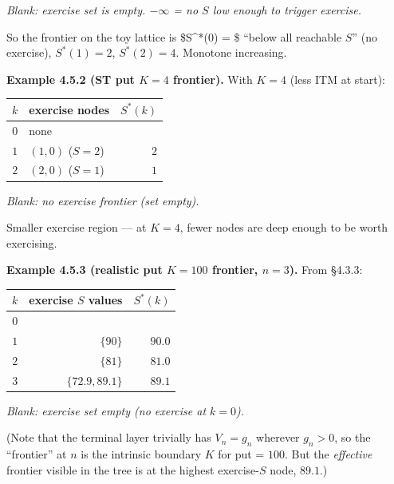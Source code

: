 \documentclass[
  10pt,
  twoside]{book}
\newcounter{none} %
\begin{document}
\emph{Blank: exercise set is empty. \(-\infty\) = no \(S\) low enough to
trigger exercise.}

So the frontier on the toy lattice is \$S\^{}*(0) = \$ ``below all
reachable \(S\)'' (no exercise), \(S^*(1) = 2\), \(S^*(2) = 4\).
Monotone increasing.

\textbf{Example 4.5.2 (ST put \(K=4\) frontier).} With \(K = 4\) (less
ITM at start):

{\def\LTcaptype{none} %
\begin{table}[H]
\centering
\begin{tabular}{|c|l|r|}
\toprule
\(k\) & exercise nodes & \(S^*(k)\) \\
\midrule



\(0\) & none & \\
\(1\) & \((1,0)\) (\(S=2\)) & \(2\) \\
\(2\) & \((2,0)\) (\(S=1\)) & \(1\) \\
\bottomrule
\end{tabular}
\end{table}
}

\emph{Blank: no exercise frontier (set empty).}

Smaller exercise region --- at \(K = 4\), fewer nodes are deep enough to
be worth exercising.

\textbf{Example 4.5.3 (realistic put \(K=100\) frontier, \(n=3\)).} From
§4.3.3:

{\def\LTcaptype{none} %
\begin{table}[H]
\centering
\begin{tabular}{|c|r|r|}
\toprule
\(k\) & exercise \(S\) values & \(S^*(k)\) \\
\midrule



\(0\) & & \\
\(1\) & \(\{90\}\) & \(90.0\) \\
\(2\) & \(\{81\}\) & \(81.0\) \\
\(3\) & \(\{72.9, 89.1\}\) & \(89.1\) \\
\bottomrule
\end{tabular}
\end{table}
}

\emph{Blank: exercise set empty (no exercise at \(k=0\)).}

(Note that the terminal layer trivially has \(V_n = g_n\) wherever
\(g_n > 0\), so the ``frontier'' at \(n\) is the intrinsic boundary
\(K\) for put = \(100\). But the \emph{effective} frontier visible in
the tree is at the highest exercise-\(S\) node, \(89.1\).)
\end{document}
